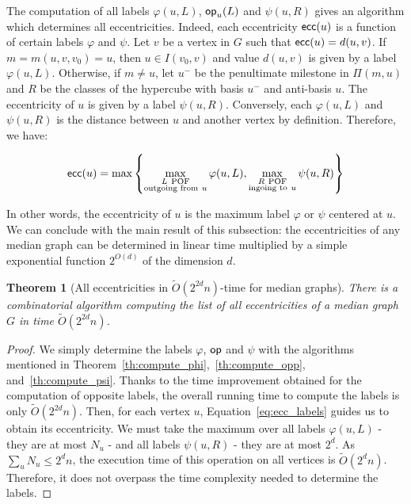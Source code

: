\documentclass{article}
\newtheorem{theorem}{Theorem}
\newcommand{\set}[1]{\left\{ #1 \right\}}
\newcommand{\ecc}{\mbox{\textsf{ecc}}}
\newcommand{\opp}{\mbox{\textsf{op}}}
\begin{document}
 The computation of all labels $\varphi(u,L)$, $\opp_u(L)$ and $\psi(u,R)$ gives an algorithm which determines all eccentricities. Indeed, each eccentricity $\ecc(u)$ is a function of certain labels $\varphi$ and $\psi$. Let $v$ be a vertex in $G$ such that $\ecc(u) = d(u,v)$. If $m = m(u,v,v_0) = u$, then $u \in I(v_0,v)$ and value $d(u,v)$ is given by a label $\varphi(u,L)$. Otherwise, if $m \neq u$, let $u^-$ be the penultimate milestone in $\Pi(m,u)$ and $R$ be the classes of the hypercube with basis $u^-$ and anti-basis $u$. The eccentricity of $u$ is given by a label $\psi(u,R)$. Conversely, each $\varphi(u,L)$ and $\psi(u,R)$ is the distance between $u$ and another vertex by definition. Therefore, we have:

\begin{equation}
\ecc(u) = \mbox{max}\set{\max\limits_{\substack{L ~\mbox{\scriptsize{POF}} \\ \mbox{\scriptsize{outgoing from}}~ u}} \varphi(u,L), \max\limits_{\substack{R ~\mbox{\scriptsize{POF}} \\ \mbox{\scriptsize{ingoing to}}~ u}} \psi(u,R)}
\label{eq:ecc_labels}
\end{equation}

In other words, the eccentricity of $u$ is the maximum label $\varphi$ or $\psi$ centered at $u$. We can conclude with the main result of this subsection: the eccentricities of any median graph can be determined in linear time multiplied by a simple exponential function $2^{O(d)}$ of the dimension $d$.

\begin{theorem}[All eccentricities in $\tilde{O}(2^{2d}n)$-time for median graphs]
There is a combinatorial algorithm computing the list of all eccentricities of a median graph $G$ in time $\tilde{O}(2^{2d}n)$.
\label{th:simple_ecc}
\end{theorem}
\begin{proof}
We simply determine the labels $\varphi$, $\opp$ and $\psi$ with the algorithms mentioned in Theorem~\ref{th:compute_phi},~\ref{th:compute_opp}, and~\ref{th:compute_psi}. Thanks to the time improvement obtained for the computation of opposite labels, the overall running time to compute the labels is only $\tilde{O}(2^{2d}n)$. Then, for each vertex $u$, Equation~\eqref{eq:ecc_labels} guides us to obtain its eccentricity. We must take the maximum over all labels $\varphi(u,L)$ - they are at most $N_u$ - and all labels $\psi(u,R)$ - they are at most $2^d$. As $\sum_u N_u \le 2^dn$, the execution time of this operation on all vertices is $\tilde{O}(2^dn)$. Therefore, it does not overpass the time complexity needed to determine the labels.
\end{proof}
\end{document}
